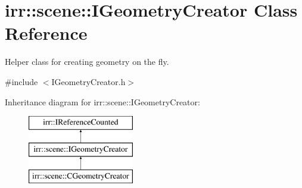 \hypertarget{classirr_1_1scene_1_1IGeometryCreator}{}\section{irr\+:\+:scene\+:\+:I\+Geometry\+Creator Class Reference}
\label{classirr_1_1scene_1_1IGeometryCreator}


Helper class for creating geometry on the fly.  




{\ttfamily \#include $<$I\+Geometry\+Creator.\+h$>$}

Inheritance diagram for irr\+:\+:scene\+:\+:I\+Geometry\+Creator\+:\begin{figure}[H]
\begin{center}
\leavevmode
\includegraphics[height=3.000000cm]{classirr_1_1scene_1_1IGeometryCreator}
\end{center}
\end{figure}
